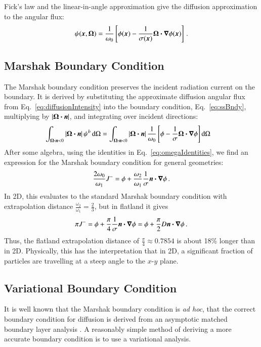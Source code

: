 \documentclass{anstrans}
\begin{document}
Fick's law and the linear-in-angle approximation give the diffusion
approximation to the angular flux:
\begin{equation} \label{eq:diffusionIntensity}
  \psi(\bm{x}, \bm{\Omega})
  = \frac{1}{\omega_0} \left[ \phi(\bm{x})
  - \frac{1}{\sigma(\bm{x})}
  \bm{\Omega} \bm{\cdot} \bm{\nabla} \phi(\bm{x}) \right] \,.
\end{equation}

\subsection{Marshak Boundary Condition}
The Marshak boundary condition preserves the incident radiation
current on the boundary. It is derived by substituting the approximate diffusion
angular flux from Eq.~\eqref{eq:diffusionIntensity} into the boundary condition,
Eq.~\eqref{eq:ssBndy}, multiplying by $\left| \bm{\Omega}\bm{\cdot} \bm{n} \right|$, and integrating over
incident directions:
\begin{align*}
\int_{\bm{\Omega}\bm{\cdot} \bm{n} < 0 } \left| \bm{\Omega}\bm{\cdot} \bm{n} \right|
\psi^b \mathop{}\!\mathrm{d}\Omega
 &= 
\int_{\bm{\Omega}\bm{\cdot} \bm{n} < 0 } \left| \bm{\Omega}\bm{\cdot} \bm{n} \right| 
 \frac{1}{\omega_0} \left[ \phi - \frac{1}{\sigma}
  \bm{\Omega} \bm{\cdot} \bm{\nabla} \phi \right]
  \mathop{}\!\mathrm{d}\Omega
\end{align*}
After some algebra, using the identities in Eq.~\eqref{eq:omegaIdentities}, we
find an expression for the Marshak boundary condition for general geometries:
\begin{equation} \label{eq:marshak}
\frac{2\omega_0}{\omega_1} J^{-}
=
\phi + \frac{\omega_2}{\omega_1}\frac{1}{\sigma} \bm{n} \bm{\cdot} \bm{\nabla} \phi \,.
\end{equation}
In 2D, this evaluates to the standard Marshak boundary condition with
extrapolation distance $\frac{\omega_2}{\omega_1} = \frac23$, but in flatland
it gives
\begin{equation*}
\pi J^{-} = \phi + \frac{\pi}{4}\frac{1}{\sigma} \bm{n} \bm{\cdot} \bm{\nabla} \phi
= \phi + \frac{\pi}{2} D \bm{n} \bm{\cdot} \bm{\nabla} \phi\,.
\end{equation*}
Thus, the flatland extrapolation distance of $\frac{\pi}{4} \approx 0.7854$
is about 18\% longer than in 2D.
Physically, this has the interpretation that in 2D, a significant fraction of
particles are travelling at a steep angle to the $x$-$y$ plane.

\subsection{Variational Boundary Condition}
It is well known that the Marshak boundary condition is \emph{ad hoc}, that
the correct boundary condition for diffusion is derived from an
asymptotic matched boundary layer analysis \cite{Mal1991}. A reasonably simple
method of deriving a more accurate boundary condition is to use a variational analysis.
\end{document}
